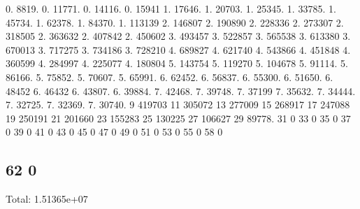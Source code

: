 0. 8819. 0. 11771. 0. 14116. 0. 15941 1. 17646. 1. 20703. 1. 25345. 1. 33785. 1. 45734. 1. 62378. 1. 84370. 1. 113139 2. 146807 2. 190890 2. 228336 2. 273307 2. 318505 2. 363632 2. 407842 2. 450602 3. 493457 3. 522857 3. 565538 3. 613380 3. 670013 3. 717275 3. 734186 3. 728210 4. 689827 4. 621740 4. 543866 4. 451848 4. 360599 4. 284997 4. 225077 4. 180804 5. 143754 5. 119270 5. 104678 5. 91114. 5. 86166. 5. 75852. 5. 70607. 5. 65991. 6. 62452. 6. 56837. 6. 55300. 6. 51650. 6. 48452 6. 46432 6. 43807. 6. 39884. 7. 42468. 7. 39748. 7. 37199 7. 35632. 7. 34444. 7. 32725. 7. 32369. 7. 30740. 9 419703 11 305072 13 277009 15 268917 17 247088 19 250191 21 201660 23 155283 25 130225 27 106627 29 89778. 31 0 33 0 35 0 37 0 39 0 41 0 43 0 45 0 47 0 49 0 51 0 53 0 55 0 58 0 \subsection*{62 0 }

Total\+: 1.\+51365e+07 